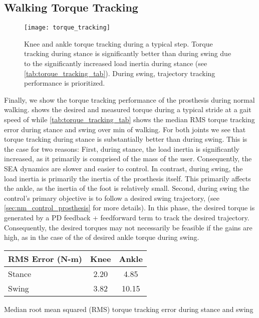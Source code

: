 \subsection{Walking Torque Tracking}
\begin{figure}[htb]
    \centering 
    \texttt{[image: torque\_tracking]}
    \caption[Knee and ankle torque tracking during a typical step]{Knee and
    ankle torque tracking during a typical step. Torque tracking during stance
    is significantly better than during swing due to the significantly increased
    load inertia during stance (see \cref{tab:torque_tracking_tab}). During
    swing, trajectory tracking performance is
    prioritized.}\label{fig:torque_tracking_plot}
\end{figure}
Finally, we show the torque tracking performance of the prosthesis during normal
walking.  shows the desired and measured torque
during a typical stride at a gait speed of  while
\cref{tab:torque_tracking_tab} shows the median RMS torque tracking error during
stance and swing over \unit[1]{min} of walking. For both joints we see that
torque tracking during stance is substantially better than during swing.  This
is the case for two reasons: First, during stance, the load inertia is
significantly increased, as it primarily is comprised of the mass of the user.
Consequently, the SEA dynamics are slower and easier to control. In contrast,
during swing, the load inertia is primarily the inertia of the prosthesis
itself. This primarily affects the ankle, as the inertia of the foot is
relatively small. Second, during swing the control's primary objective is to
follow a desired swing trajectory, (see \cref{sec:nm_control_prosthesis} for
more details). In this phase, the desired torque is generated by a PD feedback +
feedforward term to track the desired trajectory. Consequently, the desired
torques may not necessarily be feasible if the gains are high, as in the case of
the of desired ankle torque during swing.
\begin{margintable}[-1in]
    \centering
    \small
    \begin{tabular}{lcc}
        RMS Error (N-m) & Knee & Ankle \\
        \midrule
        Stance & 2.20 & 4.85  \\
        Swing  & 3.82 & 10.15 \\
    \end{tabular}
    \caption{Median root mean squared (RMS) torque tracking error during stance
    and swing}\label{tab:torque_tracking_tab}
\end{margintable}
